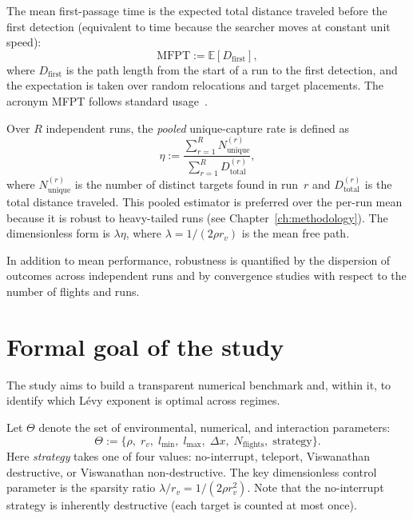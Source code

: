 \begin{Def}
The mean first-passage time is the expected total distance
traveled before the first detection (equivalent to time because
the searcher moves at constant unit speed):
\begin{equation}
    \mathrm{MFPT} := \mathbb{E}[D_{\mathrm{first}}],
    \label{eq:mfpt}
\end{equation}
where $D_{\mathrm{first}}$ is the path length from the start of a
run to the first detection, and the expectation is taken over random
relocations and target placements.  The acronym MFPT follows
standard usage~\cite{viswanathan1999optimizing}.
\end{Def}

\begin{Def}
Over $R$ independent runs, the \emph{pooled}
unique-capture rate is defined as
\begin{equation}
    \eta := \frac{\sum_{r=1}^{R} N_{\mathrm{unique}}^{(r)}}
                 {\sum_{r=1}^{R} D_{\mathrm{total}}^{(r)}},
    \label{eq:eta_formal}
\end{equation}
where $N_{\mathrm{unique}}^{(r)}$ is the number of distinct
targets found in run~$r$ and $D_{\mathrm{total}}^{(r)}$ is the
total distance traveled.  This pooled estimator is preferred over
the per-run mean because it is robust to heavy-tailed runs
(see Chapter~\ref{ch:methodology}).  The dimensionless form is
$\lambda\eta$, where $\lambda = 1/(2\rho r_v)$ is the mean free
path.
\end{Def}

In addition to mean performance, robustness is quantified by the
dispersion of outcomes across independent runs and by convergence
studies with respect to the number of flights and runs.

\section{Formal goal of the study}
The study aims to build a transparent numerical benchmark and, within it, to identify which Lévy exponent is optimal across regimes.

\begin{Def}
Let $\Theta$ denote the set of environmental, numerical, and
interaction parameters:
\begin{equation}
    \Theta := \bigl\{\rho,\; r_v,\; l_{\min},\; l_{\max},\;
    \Delta x,\; N_{\mathrm{flights}},\;
    \mathrm{strategy}\bigr\}.
    \label{eq:parameter_space}
\end{equation}
Here \emph{strategy} takes one of four values: no-interrupt,
teleport, Viswanathan destructive, or Viswanathan non-destructive.
The key dimensionless control parameter is the sparsity ratio
$\lambda/r_v = 1/(2\rho r_v^2)$.  Note that the no-interrupt
strategy is inherently destructive (each target is counted at
most once).
\end{Def}


